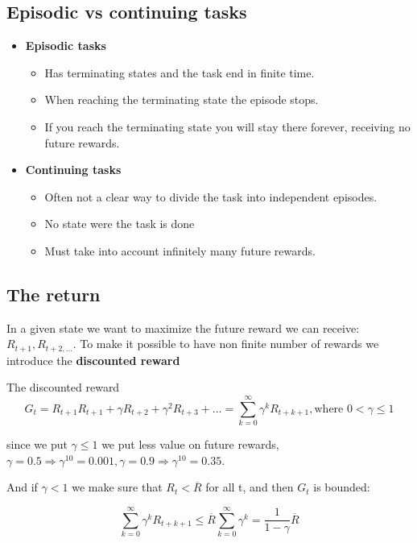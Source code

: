 \subsection{Episodic vs continuing tasks}
\begin{itemize}
	\item \textbf{Episodic tasks}
	\begin{itemize}
		\item Has terminating states and the task end in finite time.
		\item When reaching the terminating state the episode stops.
		\item If you reach the terminating state you will stay there forever, receiving no future rewards.
	\end{itemize}
	\item \textbf{Continuing tasks}
	\begin{itemize}
		\item Often not a clear way to divide the task into independent episodes.
		\item No state were the task is done
		\item Must take into account infinitely many future rewards.
	\end{itemize}
\end{itemize}


\subsection{The return}
In a given state we want to maximize the future reward we can receive: $R_{t+1},R_{t+2, ...}$. To make it possible to have non finite number of rewards we introduce the \textbf{discounted reward}

	\begin{wbox}{The discounted reward}
		\begin{equation}
			G_t = R_{t+1} R_{t+1} + \gamma R_{t+2} + \gamma^{2} R_{t+3} + \ldots = \sum_{k=0}^{\infty} \gamma^{k}R_{t+k+1}, \text{where } 0 < \gamma \le 1
		\end{equation}
	\end{wbox}

since we put $\gamma \le 1$ we put less value on future rewards, $\gamma = 0.5 \Rightarrow \gamma^{10} = 0.001, \gamma = 0.9 \Rightarrow \gamma^{10} = 0.35$.

And if $\gamma < 1$ we make sure that $R_t < \overline{R}$ for all t, and then $G_t$ is bounded:

	\begin{equation}
		\sum_{k=0}^{\infty} \gamma^{k}R_{t+k+1} \le \overline{R}\sum_{k=0}^{\infty} \gamma^{k} = \frac{1} {1-\gamma} \overline{R}
	\end{equation}


